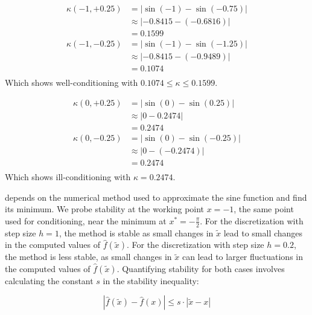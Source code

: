 \begin{align*}
    \kappa(-1, +0.25) &= |\sin(-1) - \sin(-0.75)| \\
    &\approx |{-0.8415} - ({-0.6816})| \\
    &= 0.1599 \\[1em]
    \kappa(-1, -0.25) &= |\sin(-1) - \sin(-1.25)| \\
    &\approx |{-0.8415} - ({-0.9489})| \\
    &= 0.1074 \\[1em]
\end{align*}
Which shows well-conditioning with $0.1074 \leq \kappa \leq 0.1599$.

\begin{align*}
    \kappa(0, +0.25) &= |\sin(0) - \sin(0.25)|\\
    &\approx |0 - 0.2474| \\
    &= 0.2474 \\[1em]
    \kappa(0, -0.25) &= |\sin(0) - \sin(-0.25)| \\
    &\approx |0 - (-0.2474)| \\
    &= 0.2474 \\
\end{align*}
Which shows ill-conditioning with $\kappa = 0.2474$.




 depends on the numerical method used to approximate the sine function and find its minimum.
We probe stability at the working point $x=-1$, the same point used for conditioning, near the minimum at $x^\ast = -\frac{\pi}{2}$. For the discretization with step size $h=1$, the method is stable as small changes in $\tilde{x}$ lead to small changes in the computed values of $\hat{f}(\tilde{x})$.
For the discretization with step size $h=0.2$, the method is less stable, as small changes in $\tilde{x}$ can lead to larger fluctuations in the computed values of $\hat{f}(\tilde{x})$.
Quantifying stability for both cases involves calculating the constant $s$ in the stability inequality:


\begin{equation}
    \left| \hat{f}(\tilde{x}) - \hat{f}(x) \right| \leq s \cdot \left| \tilde{x} - x \right|
\end{equation}

